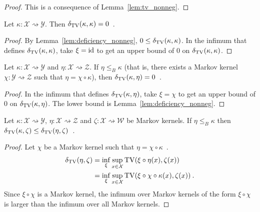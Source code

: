 \begin{proof}%
{}
This is a consequence of Lemma~\ref{lem:tv_nonneg}.
\end{proof}

\begin{lemma}
  \label{lem:deficiency_self}
  Let $\kappa: \mathcal X \rightsquigarrow \mathcal Y$. Then $\delta_{\operatorname{TV}}(\kappa, \kappa) = 0$~.
\end{lemma}

\begin{proof}%
{}
By Lemma~\ref{lem:deficiency_nonneg}, $0 \le \delta_{\operatorname{TV}}(\kappa, \kappa)$.
In the infimum that defines $\delta_{\operatorname{TV}}(\kappa, \kappa)$, take $\xi = \textup{id}$ to get an upper bound of 0 on $\delta_{\operatorname{TV}}(\kappa, \kappa)$.
\end{proof}

\begin{lemma}
  \label{lem:deficiency_comp}
  Let $\kappa: \mathcal X \rightsquigarrow \mathcal Y$ and $\eta : \mathcal X \rightsquigarrow \mathcal Z$.
  If $\eta \le_B \kappa$ (that is, there exists a Markov kernel $\chi : \mathcal Y \rightsquigarrow \mathcal Z$ such that $\eta = \chi \circ \kappa$), then $\delta_{\operatorname{TV}}(\kappa, \eta) = 0$~.
\end{lemma}

\begin{proof}%
{}
In the infimum that defines $\delta_{\operatorname{TV}}(\kappa, \eta)$, take $\xi = \chi$ to get an upper bound of 0 on $\delta_{\operatorname{TV}}(\kappa, \eta)$. The lower bound is Lemma~\ref{lem:deficiency_nonneg}.
\end{proof}

\begin{lemma}
  \label{lem:deficiency_antimono_left}
  Let $\kappa: \mathcal X \rightsquigarrow \mathcal Y$, $\eta : \mathcal X \rightsquigarrow \mathcal Z$ and $\zeta : \mathcal X \rightsquigarrow \mathcal W$ be Markov kernels.
  If $\eta \le_B \kappa$ then $\delta_{\operatorname{TV}}(\kappa, \zeta) \le \delta_{\operatorname{TV}}(\eta, \zeta)$~.
\end{lemma}

\begin{proof}%
\uses{}
Let $\chi$ be a Markov kernel such that $\eta = \chi \circ \kappa$~.
\begin{align*}
\delta_{\operatorname{TV}}(\eta, \zeta)
&= \inf_{\xi} \sup_{x \in \mathcal X} \operatorname{TV}(\xi \circ \eta (x), \zeta(x))
\\
&= \inf_\xi \sup_{x \in \mathcal X} \operatorname{TV}(\xi \circ \chi \circ \kappa (x), \zeta(x))
\: .
\end{align*}
Since $\xi \circ \chi$ is a Markov kernel, the infimum over Markov kernels of the form $\xi \circ \chi$ is larger than the infimum over all Markov kernels.
\end{proof}

